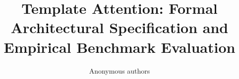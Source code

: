 \title{\textbf{Template Attention: Formal Architectural Specification and Empirical Benchmark Evaluation}}

\author{Anonymous authors}

